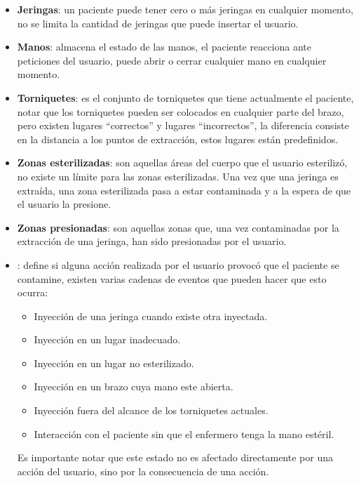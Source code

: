 \begin{itemize}
    \item \textbf{Jeringas}: un paciente puede tener cero o más jeringas en
        cualquier momento, no se limita la cantidad de jeringas que puede
        insertar el usuario.
    \item \textbf{Manos}: almacena el estado de las manos, el paciente reacciona
        ante peticiones del usuario, puede abrir o cerrar cualquier mano en
        cualquier momento.
    \item \textbf{Torniquetes}: es el conjunto de torniquetes que tiene
        actualmente el paciente, notar que los torniquetes pueden ser colocados
        en cualquier parte del brazo, pero existen lugares \enquote{correctos} y
        lugares \enquote{incorrectos}, la diferencia consiste en la distancia a
        los puntos de extracción, estos lugares están predefinidos.
    \item \textbf{Zonas esterilizadas}: son aquellas áreas del cuerpo que el
        usuario esterilizó, no existe un límite para las zonas esterilizadas.
        Una vez que una jeringa es extraída, una zona esterilizada pasa a estar
        contaminada y a la espera de que el usuario la presione.
    \item \textbf{Zonas presionadas}: son aquellas zonas que, una vez
        contaminadas por la extracción de una jeringa, han sido presionadas por
        el usuario.
    \item {}: define si alguna acción realizada por el
        usuario provocó que el paciente se contamine, existen varias cadenas de
        eventos que pueden hacer que esto ocurra:
        \begin{itemize}
            \item Inyección de una jeringa cuando existe otra inyectada.
            \item Inyección en un lugar inadecuado.
            \item Inyección en un lugar no esterilizado.
            \item Inyección en un brazo cuya mano este abierta.
            \item Inyección fuera del alcance de los torniquetes actuales.
            \item Interacción con el paciente sin que el enfermero tenga la mano
                estéril.
        \end{itemize}
        Es importante notar que este estado no es afectado directamente por una
        acción del usuario, sino por la consecuencia de una acción.
\end{itemize}

